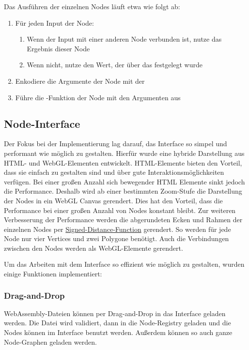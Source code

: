 \documentclass[ngerman]{article}
\begin{document}
Das Ausführen der einzelnen Nodes läuft etwa wie folgt ab:

\begin{enumerate}
  \item Für jeden Input der Node:
  \begin{enumerate}
      \item Wenn der Input mit einer anderen Node verbunden ist, nutze das Ergebnis dieser Node
      \item Wenn nicht, nutze den Wert, der über das  festgelegt wurde
  \end{enumerate}
  \item Enkodiere die Argumente der Node mit der 
  \item Führe die -Funktion der Node mit den Argumenten aus
\end{enumerate}

\subsection{Node-Interface}
Der Fokus bei der Implementierung lag darauf, das Interface so simpel und performant wie möglich zu gestalten. Hierfür wurde eine hybride Darstellung aus HTML- und WebGL-Elementen entwickelt. HTML-Elemente bieten den Vorteil, dass sie einfach zu gestalten sind und über gute Interaktionsmöglichkeiten verfügen. Bei einer großen Anzahl sich bewegender HTML Elemente sinkt jedoch die Performance. 
Deshalb wird ab einer bestimmten Zoom-Stufe die Darstellung der Nodes in ein WebGL Canvas gerendert. Dies hat den Vorteil, dass die Performance bei einer großen Anzahl von Nodes konstant bleibt. 
\br
Zur weiteren Verbesserung der Performance werden die abgerundeten Ecken und Rahmen der einzelnen Nodes per \href{https://en.wikipedia.org/wiki/Signed_distance_function}{Signed-Distance-Function} gerendert. So werden für jede Node nur vier Vertices und zwei Polygone benötigt. Auch die Verbindungen zwischen den Nodes werden als WebGL-Elemente gerendert.

Um das Arbeiten mit dem Interface so effizient wie möglich zu gestalten, wurden einige Funktionen implementiert:

\subsubsection{Drag-and-Drop}
WebAssembly-Dateien können per Drag-and-Drop in das Interface geladen werden. Die Datei wird validiert, dann in die Node-Registry geladen und die Nodes können im Interface benutzt werden. Außerdem können so auch ganze Node-Graphen geladen werden.
\end{document}
